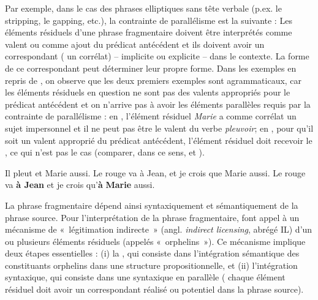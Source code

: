 Par exemple, dans le cas des phrases elliptiques sans tête verbale (p.ex. le stripping, le gapping, etc.), la contrainte de parallélisme est la suivante : Les éléments résiduels d’une phrase fragmentaire doivent être interprétés comme valent ou comme ajout du prédicat antécédent et ils doivent avoir un correspondant ({\cad} un corrélat) – implicite ou explicite – dans le contexte. La forme de ce correspondant peut déterminer leur propre forme. Dans les exemples en  repris de \citet{AbeilleToAppear}, on observe que les deux premiers exemples sont agrammaticaux, car les éléments résiduels en question ne sont pas des valents appropriés pour le prédicat antécédent et on n’arrive pas à avoir les éléments parallèles requis par la contrainte de parallélisme : en , l’élément résiduel \textit{Marie} a comme corrélat un sujet impersonnel et il ne peut pas être le valent du verbe \textit{pleuvoir}; en , pour qu’il soit un valent approprié du prédicat antécédent, l’élément résiduel doit recevoir le , ce qui n’est pas le cas (comparer, dans ce sens,  et ).

\ea \label{ch1:ex142}
\ea  *Il pleut et Marie aussi. \label{ch1:ex142a}
\ex  *Le rouge va à Jean, et je crois que Marie aussi. \label{ch1:ex142b}
\ex  Le rouge va \textbf{à Jean} et je crois qu’\textbf{à} \textbf{Marie} aussi. \label{ch1:ex142c}
\z
\z

La phrase fragmentaire dépend ainsi syntaxiquement et sémantiquement de la phrase source. Pour l’interprétation de la phrase fragmentaire, \citet{CulicoverEtAl2005} font appel à un mécanisme de «~légitimation indirecte~» (angl. \textit{indirect licensing}, abrégé IL) d’un ou plusieurs éléments résiduels (appelés «~orphelins~»). Ce mécanisme implique deux étapes essentielles : (i) la , qui consiste dans l’intégration sémantique des constituants orphelins dans une structure propositionnelle, et (ii) l’intégration syntaxique, qui consiste dans une  syntaxique en parallèle ({\cad} chaque élément résiduel doit avoir un correspondant réalisé ou potentiel dans la phrase source).

